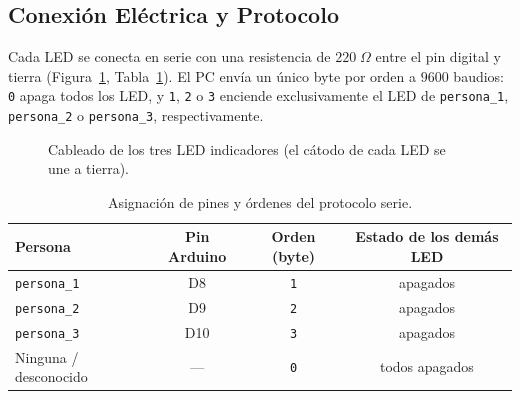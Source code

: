 \documentclass{article}
\begin{document}
\subsection{Conexión Eléctrica y Protocolo}
Cada LED se conecta en serie con una resistencia de $220\;\Omega$ entre el pin digital y tierra (Figura~\ref{fig:cableado-led}, Tabla~\ref{tab:pines-led}). El PC envía un único byte por orden a $9600$ baudios: \texttt{0} apaga todos los LED, y \texttt{1}, \texttt{2} o \texttt{3} enciende exclusivamente el LED de \texttt{persona\_1}, \texttt{persona\_2} o \texttt{persona\_3}, respectivamente.

\begin{figure}[H]
\centering
{}
\caption{Cableado de los tres LED indicadores (el cátodo de cada LED se une a tierra).}
\label{fig:cableado-led}
\end{figure}

\begin{table}[H]
\centering
\caption{Asignación de pines y órdenes del protocolo serie.}
\label{tab:pines-led}
\begin{tabular}{lccc}
\toprule
Persona & Pin Arduino & Orden (byte) & Estado de los demás LED \\
\midrule
\texttt{persona\_1} & D8 & \texttt{1} & apagados \\
\texttt{persona\_2} & D9 & \texttt{2} & apagados \\
\texttt{persona\_3} & D10 & \texttt{3} & apagados \\
Ninguna / desconocido & --- & \texttt{0} & todos apagados \\
\bottomrule
\end{tabular}
\end{table}
\end{document}

